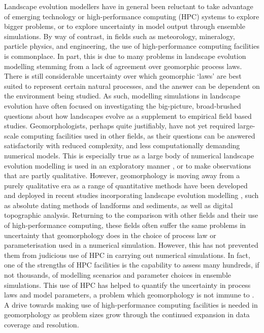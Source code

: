Landscape evolution modellers have in general been reluctant to take advantage of emerging technology or high-performance computing (HPC) systems to explore bigger problems, or to explore uncertainty in model output through ensemble simulations. By way of contrast, in fields such as meteorology, mineralogy, particle physics, and engineering, the use of high-performance computing facilities is commonplace. In part, this is due to many problems in landscape evolution modelling stemming from a lack of agreement over geomorphic process laws. There is still considerable uncertainty over which geomorphic `laws' are best suited to represent certain natural processes, and the answer can be dependent on the environment being studied. As such, modelling simulations in landscape evolution have often focused on investigating the big-picture, broad-brushed questions about how landscapes evolve as a supplement to empirical field based studies. Geomorphologists, perhaps quite justifiably, have not yet required large-scale computing facilities used in other fields, as their questions can be answered satisfactorily with reduced complexity, and less computationally demanding numerical models. This is especially true as a large body of numerical landscape evolution modelling is used in an exploratory manner \citep{hancock2003effect,lancaster2003you,Tucker2010}, or to make observations that are partly qualitative. However, geomorphology is moving away from a purely qualitative era as a range of quantitative methods have been developed and deployed in recent studies incorporating landscape evolution modelling \citep[e.g.][]{Attal2011a,mudd2017detection}, such as absolute dating methods of landforms and sediments, as well as digital topographic analysis. Returning to the comparison with other fields and their use of high-performance computing, these fields often suffer the same problems in uncertainty that geomorphology does in the choice of process law or parameterisation used in a numerical simulation. However, this has not prevented them from judicious use of HPC in carrying out numerical simulations. In fact, one of the strengths of HPC facilities is the capability to assess many hundreds, if not thousands, of modelling scenarios and parameter choices in ensemble simulations. This use of HPC has helped to quantify the uncertainty in process laws and model parameters, a problem which geomorphology is not immune to \citep{Tucker2010,pelletier2015forecasting}. A drive towards making use of high-performance computing facilities is needed in geomorphology as problem sizes grow through the continued expansion in data coverage and resolution.
